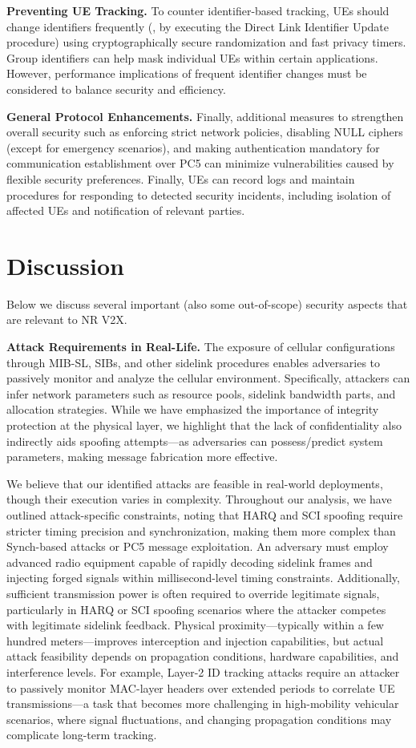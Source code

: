 \textbf{Preventing UE Tracking.} To counter identifier-based tracking, UEs should change identifiers frequently (\eg, by executing the Direct Link Identifier Update procedure) using cryptographically secure randomization and fast privacy timers. Group identifiers can help mask individual UEs within certain applications. However, performance implications of frequent identifier changes must be considered to balance security and efficiency.

\textbf{General Protocol Enhancements.} Finally, additional measures to strengthen overall security such as enforcing strict network policies, disabling NULL ciphers (except for emergency scenarios), and making authentication mandatory for communication establishment over PC5 can minimize vulnerabilities caused by flexible security preferences. Finally, UEs can record logs and maintain procedures for responding to detected security incidents, including isolation of affected UEs and notification of relevant parties.

\section{Discussion} \label{sec:discussion} Below we discuss several important (also some out-of-scope) security aspects that are relevant to NR V2X.

\textbf{Attack Requirements in Real-Life.} The exposure of cellular configurations through MIB-SL, SIBs, and other sidelink procedures enables adversaries to passively monitor and analyze the cellular environment. Specifically, attackers can infer network parameters such as resource pools, sidelink bandwidth parts, and allocation strategies. While we have emphasized the importance of integrity protection at the physical layer, we highlight that the lack of confidentiality also indirectly aids spoofing attempts—as adversaries can possess/predict system parameters, making message fabrication more effective.

We believe that our identified attacks are feasible in real-world deployments, though their execution varies in complexity. Throughout our analysis, we have outlined attack-specific constraints, noting that HARQ and SCI spoofing require stricter timing precision and synchronization, making them more complex than Synch-based attacks or PC5 message exploitation. An adversary must employ advanced radio equipment capable of rapidly decoding sidelink frames and injecting forged signals within millisecond-level timing constraints. Additionally, sufficient transmission power is often required to override legitimate signals, particularly in HARQ or SCI spoofing scenarios where the attacker competes with legitimate sidelink feedback. Physical proximity—typically within a few hundred meters—improves interception and injection capabilities, but actual attack feasibility depends on propagation conditions, hardware capabilities, and interference levels. For example, Layer-2 ID tracking attacks require an attacker to passively monitor MAC-layer headers over extended periods to correlate UE transmissions—a task that becomes more challenging in high-mobility vehicular scenarios, where signal fluctuations, and changing propagation conditions may complicate long-term tracking.

